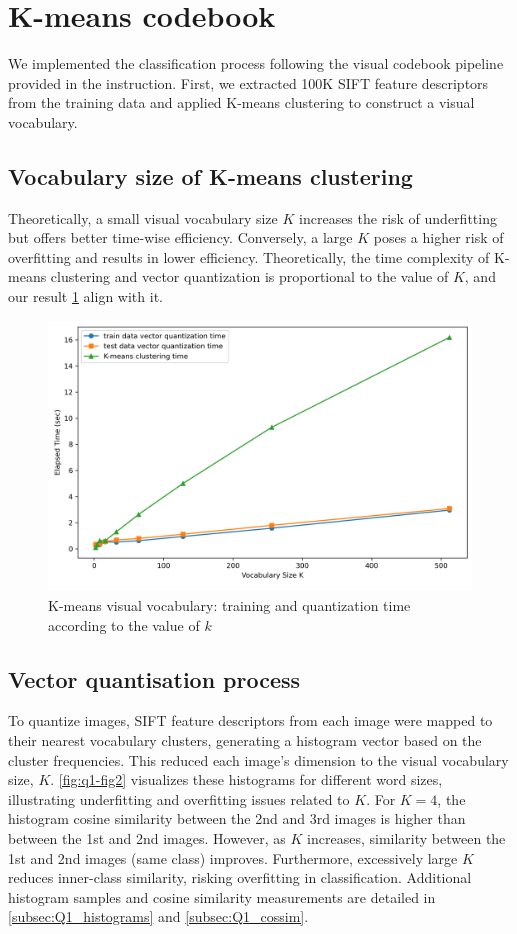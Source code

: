 \section{K-means codebook}
\label{sec:intro}

We implemented the classification process following the visual codebook pipeline provided in the instruction. First, we extracted 100K SIFT feature descriptors from the training data and applied K-means clustering to construct a visual vocabulary.

\subsection{Vocabulary size of K-means clustering}
Theoretically, a small visual vocabulary size $K$ increases the risk of underfitting but offers better time-wise efficiency. Conversely, a large $K$ poses a higher risk of overfitting and results in lower efficiency. Theoretically, the time complexity of K-means clustering and vector quantization is proportional to the value of $K$, and our result \cref{fig:q1-fig1} align with it.

\begin{figure}[htbp]
	\centering
	\includegraphics[width=0.4\linewidth]{image/q1-fig1.png}
	\caption{K-means visual vocabulary: training and quantization time according to the value of $k$}
	\label{fig:q1-fig1}
\end{figure}

\subsection{Vector quantisation process}
\label{subsec:Q1_2}
To quantize images, SIFT feature descriptors from each image were mapped to their nearest vocabulary clusters, generating a histogram vector based on the cluster frequencies. This reduced each image's dimension to the visual vocabulary size, $K$. \cref{fig:q1-fig2} visualizes these histograms for different word sizes, illustrating underfitting and overfitting issues related to $K$. For $K=4$, the histogram cosine similarity between the 2nd and 3rd images is higher than between the 1st and 2nd images. However, as $K$ increases, similarity between the 1st and 2nd images (same class) improves. Furthermore, excessively large $K$ reduces inner-class similarity, risking overfitting in classification. Additional histogram samples and cosine similarity measurements are detailed in \cref{subsec:Q1_histograms} and \cref{subsec:Q1_cossim}.
 
